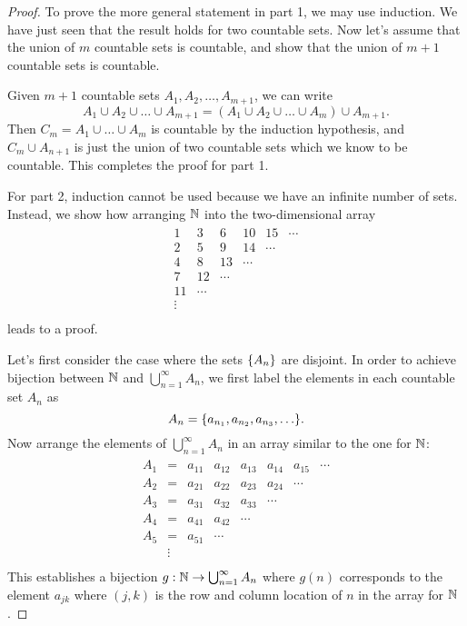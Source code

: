 \begin{proof}
  To prove the more general statement in part 1, we may use
  induction. We have just seen that the result holds for two
  countable sets. Now let's assume that the union of $m$ countable
  sets is countable, and show that the union of $m + 1$ countable
  sets is countable.

  Given $m + 1$ countable sets $A_1, A_2, \dots, A_{m + 1}$, we can write
  \[ A_1 \cup A_2 \cup \dots \cup A_{m + 1} = (A_1 \cup A_2 \cup
  \dots \cup A_m) \cup A_{m + 1}. \]
  Then $C_m = A_1 \cup \dots \cup A_m$ is countable by the induction
  hypothesis, and $C_m \cup A_{n + 1}$ is just the union of two
  countable sets which we know to be countable. This completes the
  proof for part 1.

  For part 2, induction cannot be used because we have an infinite
  number of sets. Instead, we show how arranging $\mathbb N$ into the
  two-dimensional array
  \begin{align*}
    \begin{array}{cccccc}
      1  & 3  & 6  & 10 & 15 & \cdots \\
      2  & 5  & 9  & 14 & \cdots \\
      4  & 8  & 13 & \cdots \\
      7  & 12 & \cdots \\
      11 & \cdots \\
      \vdots \\
    \end{array}
  \end{align*}
  leads to a proof.

  Let's first consider the case where the sets $\{ A_n \}$ are
  disjoint. In order to achieve bijection between $\mathbb N$ and
  $\bigcup_{n = 1}^{\infty} A_n$, we first label the elements in each
  countable set $A_n$ as
  \[ A_n = \set{a_{n_1}, a_{n_2}, a_{n_3}, \dots}. \]
  Now arrange the elements of $\bigcup_{n = 1}^{\infty} A_n$ in an
  array similar to the one for $\mathbb N$:
  \begin{align*}
    \begin{array}{cccccccc}
      A_1 & =  & a_{11} & a_{12} & a_{13} & a_{14} & a_{15} & \cdots \\
      A_2 & =  & a_{21} & a_{22} & a_{23} & a_{24} & \cdots &        \\
      A_3 & =  & a_{31} & a_{32} & a_{33} & \cdots &        &        \\
      A_4 & =  & a_{41} & a_{42} & \cdots &        &        &        \\
      A_5 & =  & a_{51} & \cdots &        &        &        &        \\
      & \vdots &        &        &        &        &        &        \\
    \end{array}
  \end{align*}
  This establishes a bijection $g : \mathbb N \to \bigcup_{n = 1}^{\infty}
  A_n$ where $g(n)$ corresponds to the element $a_{jk}$ where $(j,
  k)$ is the row and column location of $n$ in the array for $\mathbb N$.


\end{proof}
